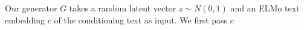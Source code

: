Our generator $G$ takes a random latent vector $z \sim N(0, 1)$ and an ELMo text embedding $c$ of the conditioning text as input. We first pass $c$  